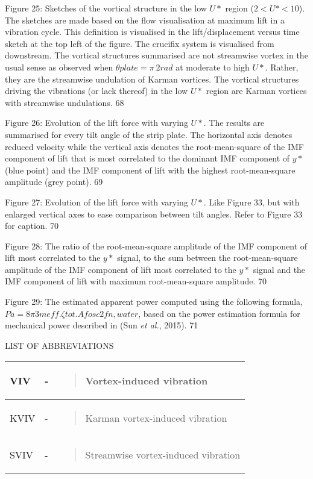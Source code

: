 \documentclass[]{article}
\begin{document}
Figure 25: Sketches of the vortical structure in the low \(U*\) region
(\(2 < U* < 10\)). The sketches are made based on the flow visualisation
at maximum lift in a vibration cycle. This definition is visualised in
the lift/displacement versus time sketch at the top left of the figure.
The crucifix system is visualised from downstream. The vortical
structures summarised are not streamwise vortex in the usual sense as
observed when \(\theta plate = \pi\ 2rad\) at moderate to high \(U*\).
Rather, they are the streamwise undulation of Karman vortices. The
vortical structures driving the vibrations (or lack thereof) in the low
\(U*\) region are Karman vortices with streamwise undulations. 68

Figure 26: Evolution of the lift force with varying \(U*\). The results
are summarised for every tilt angle of the strip plate. The horizontal
axis denotes reduced velocity while the vertical axis denotes the
root-mean-square of the IMF component of lift that is most correlated to
the dominant IMF component of \(y*\) (blue point) and the IMF component
of lift with the highest root-mean-square amplitude (grey point). 69

Figure 27: Evolution of the lift force with varying \(U*\). Like Figure
33, but with enlarged vertical axes to ease comparison between tilt
angles. Refer to Figure 33 for caption. 70

Figure 28: The ratio of the root-mean-square amplitude of the IMF
component of lift most correlated to the \(y*\) signal, to the sum
between the root-mean-square amplitude of the IMF component of lift most
correlated to the \(y*\) signal and the IMF component of lift with
maximum root-mean-square amplitude. 70

Figure 29: The estimated apparent power computed using the following
formula, \(Pa = 8\pi 3meff.\zeta tot.Afosc2fn,water\), based on the
power estimation formula for mechanical power described in (Sun \emph{et
al.}, 2015). 71

\protect\hypertarget{_Toc41048789}{}{}LIST OF ABBREVIATIONS

\begin{longtable}[]{@{}lll@{}}
\toprule
VIV & - & \begin{quote}
Vortex-induced vibration
\end{quote}\tabularnewline
\midrule
\endhead
KVIV & - & \begin{quote}
Karman vortex-induced vibration
\end{quote}\tabularnewline
SVIV & - & \begin{quote}
Streamwise vortex-induced vibration
\end{quote}\tabularnewline
\bottomrule
\end{longtable}
\end{document}

